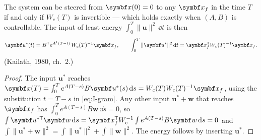 \begin{theorem}
\label{thm:I-mineng}
The system can be steered from $\vx(0) = 0$ to any $\vx_f$ in the time $T$ if and only if $W_c(T)$ is invertible — which holds exactly when $(A, B)$ is controllable. The input of least energy $\int_0^T\|\symbf u\|^2\,\dd t$ is then
\begin{equation}\label{eq:I-minu}
  \symbf u^*(t) = B^\T e^{A^\T(T - t)}\,W_c(T)^{-1}\vx_f, \qquad \int_0^T\|\symbf u^*\|^2\,\dd t = \vx_f^\T W_c(T)^{-1}\vx_f .
\end{equation}
(Kailath, 1980, ch.~2.)
\end{theorem}
\begin{proof}
The input $\symbf u^*$ reaches $\vx(T) = \int_0^T e^{A(T-s)}B\symbf u^*(s)\,\dd s = W_c(T)W_c(T)^{-1}\vx_f$, using the substitution $t = T - s$ in \cref{eq:I-gram}. Any other input $\symbf u^* + \symbf w$ that reaches $\vx_f$ has $\int_0^T e^{A(T-s)}B\symbf w\,\dd s = 0$, so $\int\symbf u^{*\T}\symbf w\,\dd s = \vx_f^\T W_c^{-1}\int e^{A(T-s)}B\symbf w\,\dd s = 0$ and $\int\|\symbf u^* + \symbf w\|^2 = \int\|\symbf u^*\|^2 + \int\|\symbf w\|^2$. The energy follows by inserting $\symbf u^*$.
\end{proof}

